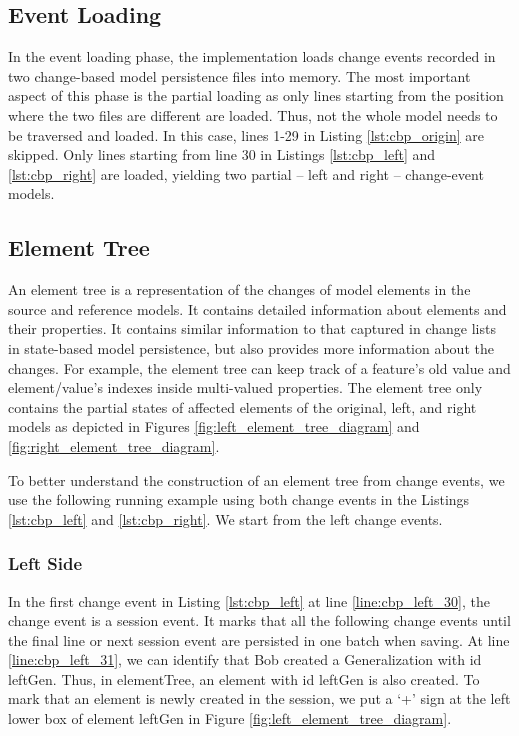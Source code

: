 \subsection{Event Loading}
\label{sec:event_loading}
In the event loading phase, the implementation loads change events recorded in two change-based model persistence files into memory.
The most important aspect of this phase is the partial loading as only lines starting from the position where the two files are different are loaded.
Thus, not the whole model needs to be traversed and loaded.
In this case, lines 1-29 in Listing \ref{lst:cbp_origin} are skipped. Only lines starting from line 30 in Listings \ref{lst:cbp_left} and \ref{lst:cbp_right} are loaded, yielding two partial -- left and right -- change-event models. 

\subsection{Element Tree}
\label{sec:tree_construction}
An element tree is a representation of the changes of model elements in the source and reference models. It contains detailed information about elements and their properties. It contains similar information to that captured in change lists in state-based model persistence, but also provides more information about the changes. For example, the element tree can keep track of a feature's old value and element/value's indexes inside multi-valued properties. The element tree only contains the partial states of affected elements of the original, left, and right models as depicted in Figures \ref{fig:left_element_tree_diagram} and \ref{fig:right_element_tree_diagram}.

To better understand the construction of an element tree from change events, we use the following running example using both change events in the Listings \ref{lst:cbp_left} and \ref{lst:cbp_right}. We start from the left change events. 

\subsubsection{Left Side}\label{sec:left_side}
In the first change event in Listing \ref{lst:cbp_left} at line \ref{line:cbp_left_30}, the change event is a \textsf{session} event. It marks that all the following change events until the final line or next \textsf{session} event are persisted in one batch when saving. At line \ref{line:cbp_left_31}, we can identify that Bob created a \textsf{Generalization} with id \textsf{leftGen}. Thus, in \textsf{elementTree}, an element with id \textsf{leftGen} is also created. To mark that an element is newly created in the session, we put a `+' sign at the left lower box of element \textsf{leftGen} in Figure \ref{fig:left_element_tree_diagram}.

